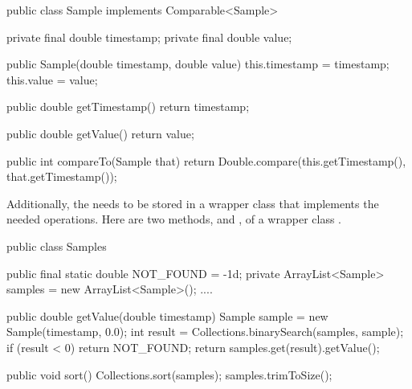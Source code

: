 \begin{shortlisting}
   
    public class Sample implements Comparable<Sample> {

        private final double timestamp;
        private final double value;
	
        public Sample(double timestamp, double value) {
            this.timestamp = timestamp;
            this.value = value;
        }
	
        public double getTimestamp() {
            return timestamp;
        }
	
        public double getValue() {
            return value;
        }
	      
        public int compareTo(Sample that) {
            return Double.compare(this.getTimestamp(), that.getTimestamp());	
        }
    }

\end{shortlisting}

Additionally, the  needs to be stored in a wrapper class that
implements the needed operations. Here are two methods,  and
, of a wrapper class .

\begin{shortlisting}
    public class Samples {
    
    	public final static double NOT_FOUND = -1d;
        private ArrayList<Sample> samples = new ArrayList<Sample>();
        ....
		
        public double getValue(double timestamp) {
            Sample sample = new Sample(timestamp, 0.0);
            int result = Collections.binarySearch(samples, sample);
            if (result < 0) {
                return NOT_FOUND;
            }
            return samples.get(result).getValue();
        }
		
        public void sort() {
            Collections.sort(samples);
            samples.trimToSize();	
        }
    }
    
\end{shortlisting}
  
